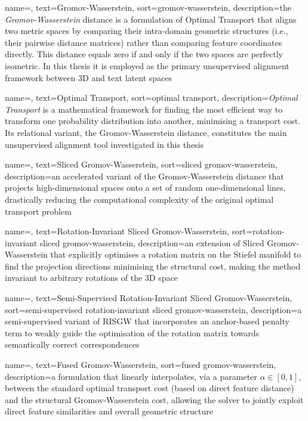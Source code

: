  {
    name=,
    text=Gromov-Wasserstein,
    sort=gromov-wasserstein,
    description={the \emph{Gromov-Wasserstein} distance is a formulation of Optimal Transport that aligns two metric spaces by comparing their intra-domain geometric structures (i.e., their pairwise distance matrices) rather than comparing feature coordinates directly. This distance equals zero if and only if the two spaces are perfectly isometric. In this thesis it is employed as the primary unsupervised alignment framework between 3D and text latent spaces}
}

 {
    name=,
    text=Optimal Transport,
    sort=optimal transport,
    description={\emph{Optimal Transport} is a mathematical framework for finding the most efficient way to transform one probability distribution into another, minimising a transport cost. Its relational variant, the Gromov-Wasserstein distance, constitutes the main unsupervised alignment tool investigated in this thesis}
}

 {
    name=,
    text=Sliced Gromov-Wasserstein,
    sort=sliced gromov-wasserstein,
    description={an accelerated variant of the Gromov-Wasserstein distance that projects high-dimensional spaces onto a set of random one-dimensional lines, drastically reducing the computational complexity of the original optimal transport problem}
}

 {
    name=,
    text=Rotation-Invariant Sliced Gromov-Wasserstein,
    sort=rotation-invariant sliced gromov-wasserstein,
    description={an extension of Sliced Gromov-Wasserstein that explicitly optimises a rotation matrix on the Stiefel manifold to find the projection directions minimising the structural cost, making the method invariant to arbitrary rotations of the 3D space}
}

 {
    name=,
    text=Semi-Supervised Rotation-Invariant Sliced Gromov-Wasserstein,
    sort=semi-supervised rotation-invariant sliced gromov-wasserstein,
    description={a semi-supervised variant of RISGW that incorporates an anchor-based penalty term to weakly guide the optimisation of the rotation matrix towards semantically correct correspondences}
}

 {
    name=,
    text=Fused Gromov-Wasserstein,
    sort=fused gromov-wasserstein,
    description={a formulation that linearly interpolates, via a parameter $\alpha \in [0,1]$, between the standard optimal transport cost (based on direct feature distance) and the structural Gromov-Wasserstein cost, allowing the solver to jointly exploit direct feature similarities and overall geometric structure}
}

